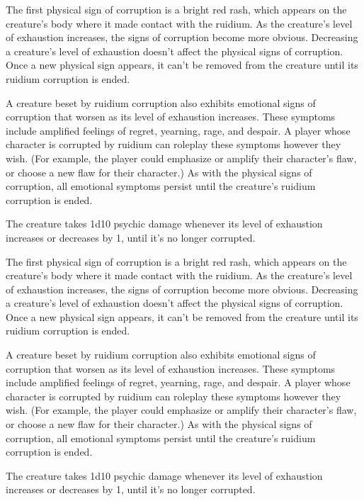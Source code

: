 \documentclass[10pt,a4paper,twoside,fancy,bg=print,twocolumn,openany,nodeprecatedcode]{dndarticle}
\begin{document}
The first physical sign of corruption is a bright red rash, which appears on the creature's body where it made contact with the ruidium. As the creature's level of exhaustion increases, the signs of corruption become more obvious. Decreasing a creature's level of exhaustion doesn't affect the physical signs of corruption. Once a new physical sign appears, it can't be removed from the creature until its ruidium corruption is ended.

A creature beset by ruidium corruption also exhibits emotional signs of corruption that worsen as its level of exhaustion increases. These symptoms include amplified feelings of regret, yearning, rage, and despair. A player whose character is corrupted by ruidium can roleplay these symptoms however they wish. (For example, the player could emphasize or amplify their character's flaw, or choose a new flaw for their character.) As with the physical signs of corruption, all emotional symptoms persist until the creature's ruidium corruption is ended.

The creature takes 1d10 psychic damage whenever its level of exhaustion increases or decreases by 1, until it's no longer corrupted.

The first physical sign of corruption is a bright red rash, which appears on the creature's body where it made contact with the ruidium. As the creature's level of exhaustion increases, the signs of corruption become more obvious. Decreasing a creature's level of exhaustion doesn't affect the physical signs of corruption. Once a new physical sign appears, it can't be removed from the creature until its ruidium corruption is ended.

A creature beset by ruidium corruption also exhibits emotional signs of corruption that worsen as its level of exhaustion increases. These symptoms include amplified feelings of regret, yearning, rage, and despair. A player whose character is corrupted by ruidium can roleplay these symptoms however they wish. (For example, the player could emphasize or amplify their character's flaw, or choose a new flaw for their character.) As with the physical signs of corruption, all emotional symptoms persist until the creature's ruidium corruption is ended.

The creature takes 1d10 psychic damage whenever its level of exhaustion increases or decreases by 1, until it's no longer corrupted.
\end{document}
